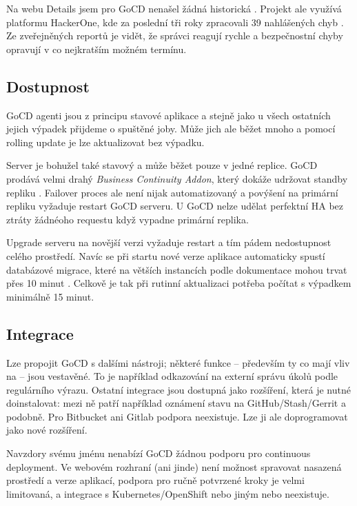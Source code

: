         Na webu  Details jsem pro GoCD nenašel žádná historická . Projekt ale využívá platformu HackerOne, kde za poslední tři roky zpracovali 39 nahlášených chyb \cite{gocd-hackerone}. Ze zveřejněných reportů je vidět, že správci reagují rychle a bezpečnostní chyby opravují v co nejkratším možném termínu.

    \subsection{Dostupnost}
        GoCD agenti jsou z principu stavové aplikace a stejně jako u všech ostatních \CI jejich výpadek přijdeme o spuštěné joby. Může jich ale běžet mnoho a pomocí rolling update je lze aktualizovat bez výpadku.

        Server je bohužel také stavový a může běžet pouze v jedné replice. GoCD prodává velmi drahý \textit{Business Continuity Addon}, který dokáže udržovat standby repliku \cite{gocd-ha}. Failover proces ale není nijak automatizovaný a povýšení na primární repliku vyžaduje restart GoCD serveru. U GoCD nelze udělat perfektní HA bez ztráty žádnéoho requestu když vypadne primární replika.

        Upgrade serveru na novější verzi vyžaduje restart a tím pádem nedostupnost celého prostředí. Navíc se při startu nové verze aplikace automaticky spustí databázové migrace, které na větších instancích podle dokumentace mohou trvat přes 10 minut \cite{gocd-upgrading}. Celkově je tak při rutinní aktualizaci potřeba počítat s výpadkem minimálně 15 minut.

        \blind[1]

    \subsection{Integrace}
        Lze propojit GoCD s dalšími nástroji; některé funkce -- především ty co mají vliv na  -- jsou vestavěné. To je například odkazování na externí správu úkolů podle regulárního výrazu. Ostatní integrace jsou dostupná jako rozšíření, která je nutné doinstalovat: mezi ně patří například oznámení stavu na GitHub/Stash/Gerrit a podobně. Pro Bitbucket ani Gitlab podpora neexistuje. Lze ji ale doprogramovat jako nové rozšíření.

        Navzdory svému jménu nenabízí GoCD žádnou podporu pro continuous deployment. Ve webovém rozhraní (ani jinde) není možnost spravovat nasazená prostředí a verze aplikací, podpora pro ručně potvrzené kroky je velmi limitovaná, a integrace s Kubernetes/OpenShift nebo jiným  nebo neexistuje.

